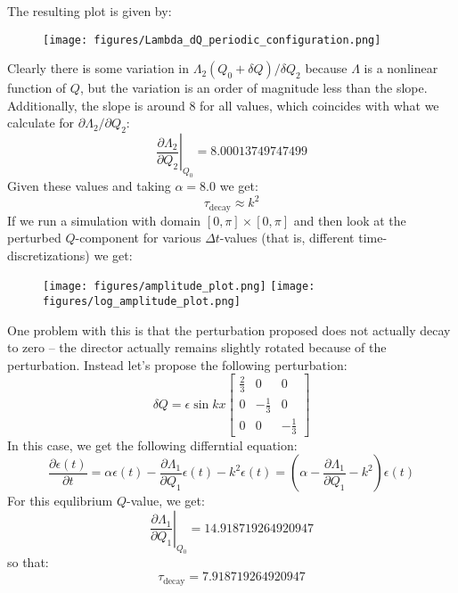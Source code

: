 \documentclass[reqno]{article}
\begin{document}
The resulting plot is given by:
\begin{figure}[h]
    \centering
    \texttt{[image: figures/Lambda\_dQ\_periodic\_configuration.png]}
\end{figure}
Clearly there is some variation in $\Lambda_2(Q_0 + \delta Q) / \delta Q_2$ because $\Lambda$ is a nonlinear function of $Q$, but the variation is an order of magnitude less than the slope.
Additionally, the slope is around 8 for all values, which coincides with what we calculate for $\partial \Lambda_2 / \partial Q_2$:
\begin{equation}
    \left. \frac{\partial \Lambda_2}{\partial Q_2} \right|_{Q_0} = 8.00013749747499
\end{equation}
Given these values and taking $\alpha = 8.0$ we get:
\begin{equation}
    \tau_\text{decay} \approx k^2
\end{equation}
If we run a simulation with domain $[0, \pi]\times [0, \pi]$ and then look at the perturbed $Q$-component for various $\Delta t$-values (that is, different time-discretizations) we get:
\begin{figure}[h]
    \centering
    \texttt{[image: figures/amplitude\_plot.png]}
    \texttt{[image: figures/log\_amplitude\_plot.png]}
\end{figure}

One problem with this is that the perturbation proposed does not actually decay to zero -- the director actually remains slightly rotated because of the perturbation.
Instead let's propose the following perturbation:
\begin{equation}
    \delta Q
    =
    \epsilon \sin k x
    \begin{bmatrix}
        \frac23 &0 &0 \\
        0 &-\frac13 &0 \\
        0 &0 &-\frac13
    \end{bmatrix}
\end{equation}
In this case, we get the following differntial equation:
\begin{equation}
    \frac{\partial \epsilon(t)}{\partial t}
    =
    \alpha \epsilon(t)
    - \frac{\partial \Lambda_1}{\partial Q_1} \epsilon(t)
    - k^2 \epsilon(t)
    =
    \left( \alpha - \frac{\partial \Lambda_1}{\partial Q_1} - k^2 \right) \epsilon(t)
\end{equation}
For this equlibrium $Q$-value, we get:
\begin{equation}
    \left.\frac{\partial \Lambda_1}{\partial Q_1}\right|_{Q_0}
    =
    14.918719264920947
\end{equation}
so that:
\begin{equation}
    \tau_\text{decay}
    =
    7.918719264920947
\end{equation}
\end{document}
